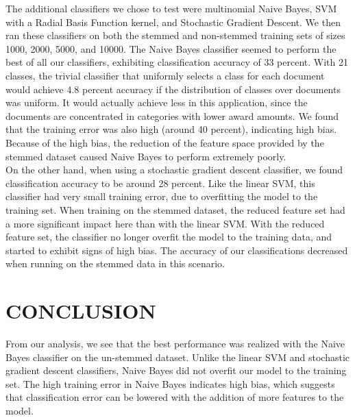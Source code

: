 \documentclass{article}
\begin{document}
The additional classifiers we chose to test were multinomial Naive Bayes, SVM with a Radial Basis Function kernel, and Stochastic Gradient Descent.  We then ran these classifiers on both the stemmed and non-stemmed training sets of sizes 1000, 2000, 5000, and 10000.  The Naive Bayes classifier seemed to perform the best of all our classifiers, exhibiting classification accuracy of 33 percent.  With 21 classes, the trivial classifier that uniformly selects a class for each document would achieve 4.8 percent accuracy if the distribution of classes over documents was uniform.  It would actually achieve less in this application, since the documents are concentrated in categories with lower award amounts.  We found that the training error was also high (around 40 percent), indicating high bias.  Because of the high bias, the reduction of the feature space provided by the stemmed dataset caused Naive Bayes to perform extremely poorly.\\

On the other hand, when using a stochastic gradient descent classifier, we found classification accuracy to be around 28 percent.  Like the linear SVM, this classifier had very small training error, due to overfitting the model to the training set.  When training on the stemmed dataset, the reduced feature set had a more significant impact here than with the linear SVM.  With the reduced feature set, the classifier no longer overfit the model to the training data, and started to exhibit signs of high bias.  The accuracy of our classifications decreased when running on the stemmed data in this scenario.\\

\section{CONCLUSION}
From our analysis, we see that the best performance was realized with the Naive Bayes classifier on the un-stemmed dataset.  Unlike the linear SVM and stochastic gradient descent classifiers, Naive Bayes did not overfit our model to the training set.  The high training error in Naive Bayes indicates high bias, which suggests that classification error can be lowered with the addition of more features to the model.
\end{document}
